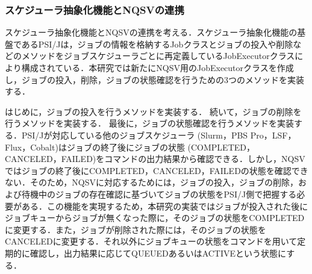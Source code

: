 \subsubsection{スケジューラ抽象化機能とNQSVの連携}
スケジューラ抽象化機能とNQSVの連携を考える．スケジューラ抽象化機能の基盤であるPSI/Jは，ジョブの情報を格納するJobクラスとジョブの投入や削除などのメソッドをジョブスケジューラごとに再定義しているJobExecutorクラスにより構成されている．本研究では新たにNQSV用のJobExecutorクラスを作成し，ジョブの投入，削除，ジョブの状態確認を行うための3つのメソッドを実装する．\par
はじめに，ジョブの投入を行うメソッドを実装する．
続いて，ジョブの削除を行うメソッドを実装する．
最後に，ジョブの状態確認を行うメソッドを実装する．PSI/Jが対応している他のジョブスケジューラ (Slurm，PBS Pro，LSF，Flux，Cobalt)はジョブの終了後にジョブの状態 (COMPLETED，CANCELED，FAILED)をコマンドの出力結果から確認できる．しかし，NQSVではジョブの終了後にCOMPLETED，CANCELED，FAILEDの状態を確認できない．そのため，NQSVに対応するためには，ジョブの投入，ジョブの削除，および待機中のジョブの存在確認に基づいてジョブの状態をPSI/J側で把握する必要がある．この機能を実現するため，本研究の実装ではジョブが投入された後にジョブキューからジョブが無くなった際に，そのジョブの状態をCOMPLETEDに変更する．また，ジョブが削除された際には，そのジョブの状態をCANCELEDに変更する．それ以外にジョブキューの状態をコマンドを用いて定期的に確認し，出力結果に応じてQUEUEDあるいはACTIVEという状態にする．\par
